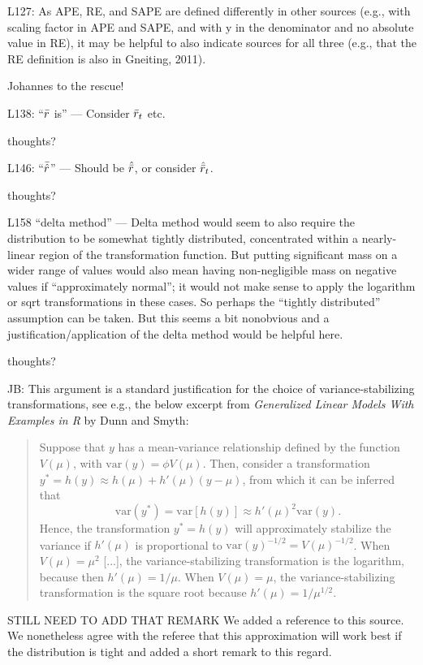 \documentclass{article}
\newcommand{\red}{\color{red}}
\newcommand{\black}{\color{black}}
\begin{document}
L127: As APE, RE, and SAPE are defined differently in other sources (e.g., with scaling factor in APE and SAPE, and with y in the denominator and no absolute value in RE), it may be helpful to also indicate sources for all three (e.g., that the RE definition is also in Gneiting, 2011).

\black
Johannes to the rescue! 

\red

L138: “$\Bar{r}$ is” — Consider $\Bar{r}_t$ etc.

\black
thoughts?

L146: “$\Bar{\hat{r}}$” — Should be $\hat{\Bar{r}}$, or consider $\hat{\Bar{r}}_t$.

\black
thoughts?

\red

L158 “delta method” — Delta method would seem to also require the distribution to be somewhat tightly distributed, concentrated within a nearly-linear region of the transformation function. But putting significant mass on a wider range of values would also mean having non-negligible mass on negative values if “approximately normal”; it would not make sense to apply the logarithm or sqrt transformations in these cases. So perhaps the “tightly distributed” assumption can be taken. But this seems a bit nonobvious and a justification/application of the delta method would be helpful here.

\black
thoughts?

\red
JB: This argument is a standard justification for the choice of variance-stabilizing transformations, see e.g., the below excerpt from \textit{Generalized Linear Models With Examples in R} by Dunn and Smyth:
\begin{quote}
Suppose that $y$ has a mean-variance relationship defined by the function $V(\mu)$, with $\text{var}(y) = \phi V(\mu)$. Then, consider a transformation $y^* = h(y) \approx h(\mu) + h'(\mu)(y - \mu)$, from which it can be inferred that
$$
\text{var}(y^*) = \text{var}[h(y)] \approx h'(\mu)^2\text{var}(y).
$$
Hence, the transformation $y^* = h(y)$ will approximately stabilize the variance if $h'(\mu)$ is proportional to $\text{var}(y)^{-1/2} = V(\mu)^{-1/2}$. When $V(\mu) = \mu^2$ [...], the variance-stabilizing transformation is the logarithm, because then $h'(\mu) = 1/\mu$.  When $V(\mu) = \mu$, the variance-stabilizing transformation is the square root because $h'(\mu) = 1/\mu^{1/2}$.
\end{quote}

STILL NEED TO ADD THAT REMARK
We added a reference to this source. We nonetheless agree with the referee that this approximation will work best if the distribution is tight and added a short remark to this regard.
\end{document}
